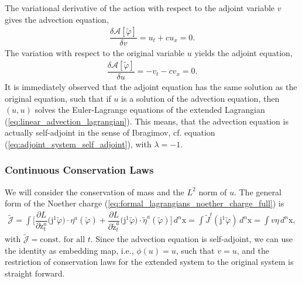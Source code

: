 \documentclass[12pt,a4paper,reqno]{article}
\begin{document}
The variational derivative of the action with respect to the adjoint variable ${\ensuremath{{\ensuremath{{v}}}}}$ gives the advection equation,
\begin{align}
\dfrac{\delta \mathcal{A} [\tilde{\ensuremath{\varphi}}]}{\delta {\ensuremath{{\ensuremath{{v}}}}}} = {\ensuremath{{\ensuremath{{u}}}}}_{\ensuremath{{\ensuremath{{t}}}}} + c {\ensuremath{{\ensuremath{{u}}}}}_{\ensuremath{{\ensuremath{{x}}}}} = 0 .
\end{align}
The variation with respect to the original variable ${\ensuremath{{\ensuremath{{u}}}}}$ yields the adjoint equation,
\begin{align}
\dfrac{\delta \mathcal{A} [\tilde{\ensuremath{\varphi}}]}{\delta {\ensuremath{{\ensuremath{{u}}}}}} = - {\ensuremath{{\ensuremath{{v}}}}}_{t} - c {\ensuremath{{\ensuremath{{v}}}}}_{\ensuremath{{\ensuremath{{x}}}}} = 0 .
\end{align}
It is immediately observed that the adjoint equation has the same solution as the original equation, such that if ${\ensuremath{{\ensuremath{{u}}}}}$ is a solution of the advection equation, then $({\ensuremath{{\ensuremath{{u}}}}}, {\ensuremath{{\ensuremath{{u}}}}})$ solves the Euler-Lagrange equations of the extended Lagrangian (\ref{eq:linear_advection_lagrangian}).
This means, that the advection equation is actually self-adjoint in the sense of Ibragimov, cf. equation (\ref{eq:adjoint_system_self_adjoint}), with $\lambda = -1$.

\subsubsection{Continuous Conservation Laws}
\label{sec:advection_noether_continuous}

We will consider the conservation of mass and the $L^{2}$ norm of ${\ensuremath{{\ensuremath{{u}}}}}$.
The general form of the Noether charge (\ref{eq:formal_lagrangians_noether_charge_full}) is
\begin{align}\label{eq:linear_advection_conservation_law_global}
\tilde{\mathcal{J}}
= \int \bigg[ \dfrac{\partial L}{\partial {\ensuremath{{\ensuremath{\mathrm{{z}}}}}}_{t}^{a}} \big( {\ensuremath{\mathrm{j}}}^{1} \tilde{\ensuremath{\varphi}} \big) \cdot \eta^{a} (\tilde{\ensuremath{\varphi}}) + \dfrac{\partial L}{\partial \tilde{\ensuremath{{\ensuremath{\mathrm{{z}}}}}}_{t}^{a}} \big( {\ensuremath{\mathrm{j}}}^{1} \tilde{\ensuremath{\varphi}} \big) \cdot \tilde{\eta}^{a} (\tilde{\ensuremath{\varphi}}) \bigg] \, d^{n} {\ensuremath{{\ensuremath{\mathrm{{x}}}}}} 
= \int \tilde{J}^{t} ({\ensuremath{\mathrm{j}}}^{1} \tilde{\ensuremath{\varphi}}) \, d^{n} {\ensuremath{{\ensuremath{\mathrm{{x}}}}}} 
= \int {\ensuremath{{\ensuremath{{v}}}}} \eta \, d^{n} {\ensuremath{{\ensuremath{\mathrm{{x}}}}}} 
,
\end{align}
with $\tilde{\mathcal{J}} = \text{const. for all ${\ensuremath{{\ensuremath{{t}}}}}$}$.
Since the advection equation is self-adjoint, we can use the identity as embedding map, i.e., $\phi ({\ensuremath{{\ensuremath{{u}}}}}) = {\ensuremath{{\ensuremath{{u}}}}}$, such that ${\ensuremath{{\ensuremath{{v}}}}} = {\ensuremath{{\ensuremath{{u}}}}}$, and the restriction of conservation laws for the extended system to the original system is straight forward.
\end{document}
